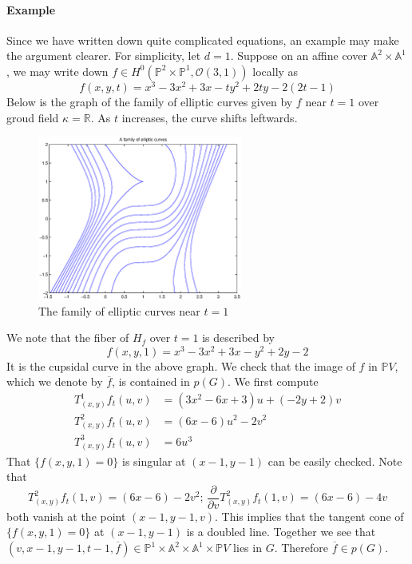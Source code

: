 \documentclass[12pt]{article}
\theoremstyle{plain}
\theoremstyle{definition}
\newcommand{\IA}{\mathbb{A}}
\newcommand{\IP}{\mathbb{P}}
\newcommand{\sO}{\mathcal{O}}
\newcommand{\<}{\langle}
\renewcommand{\>}{\rangle}
\newcommand{\p}{\partial}
\newcommand{\IR}{\mathbb{R}}
\begin{document}
\paragraph{Example} Since we have written down quite complicated equations, an example may make the argument clearer. For simplicity, let $d = 1$. Suppose on an affine cover $\IA^2 \times \IA^1$, we may write down $f \in H^0(\IP^2 \times \IP^1, \sO(3, 1))$ locally as 
$$ f(x, y, t) = x^3 - 3x^2 + 3x - t y^2 + 2ty - 2(2t - 1)$$
Below is the graph of the family of elliptic curves given by $f$ near $t = 1$ over groud field $\kappa = \IR$. As $t$ increases, the curve shifts leftwards. 
\begin{figure}[h!]
  \label{figure}
  \centering
      \includegraphics[width=0.6\textwidth]{Family}
  \caption{The family of elliptic curves near $t = 1$}
\end{figure}
We note that the fiber of $H_f$ over $t = 1$ is described by 
$$ f(x, y, 1) = x^3 - 3x^2 + 3x - y^2 + 2y - 2 $$
It is the cupsidal curve in the above graph. We check that the image of $f$ in $\IP V$, which we denote by $\overline{f}$, is contained in $p(G)$. We first compute 
\begin{align*}
T^1_{(x, y)} f_t (u, v) &= (3x^2 - 6x + 3) u + (-2 y + 2) v \\
T^2_{(x, y)} f_t (u, v) &= (6x - 6) u^2 - 2 v^2 \\
T^3_{(x, y)} f_t (u, v) &= 6u^3 
\end{align*} 
That $\{ f(x, y, 1) = 0 \}$ is singular at $(x - 1, y - 1)$ can be easily checked. Note that 
$$ T^2_{(x, y)} f_t (1, v) = (6x - 6) - 2 v^2; \, \frac{\p}{\p v} T^2_{(x, y)} f_t (1, v) = (6x - 6) - 4 v $$
both vanish at the point $(x - 1, y - 1, v)$. This implies that the tangent cone of $\{ f(x, y, 1) = 0 \}$ at $(x - 1, y - 1)$ is a doubled line. Together we see that $(v, x-1, y-1, t-1, \overline{f}) \in \IP^1 \times \IA^2 \times \IA^1 \times \IP V$ lies in $G$. Therefore $\overline{f} \in p(G)$.   
\end{document}
